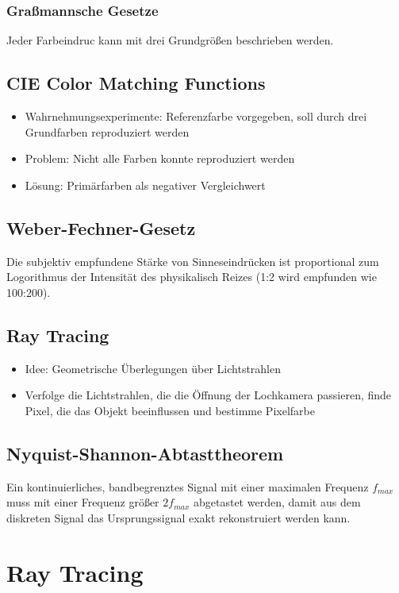 \subsubsection{Graßmannsche Gesetze}
Jeder Farbeindruc kann mit drei Grundgrößen beschrieben werden.


\subsection{CIE Color Matching Functions}
\begin{itemize}
	\item Wahrnehmungsexperimente: Referenzfarbe vorgegeben, soll durch drei Grundfarben reproduziert werden
	\item Problem: Nicht alle Farben konnte reproduziert werden
	\item Lösung: Primärfarben als negativer Vergleichwert
\end{itemize}


\subsection{Weber-Fechner-Gesetz}
Die subjektiv empfundene Stärke von Sinneseindrücken ist proportional zum Logorithmus der Intensität des physikalisch Reizes (1:2 wird empfunden wie 100:200).


\subsection{Ray Tracing}
\begin{itemize}
	\item Idee: Geometrische Überlegungen über Lichtstrahlen
	\item Verfolge die Lichtstrahlen, die die Öffnung der Lochkamera passieren, finde Pixel, die das Objekt beeinflussen und bestimme Pixelfarbe
\end{itemize}


\subsection{Nyquist-Shannon-Abtasttheorem}
Ein kontinuierliches, bandbegrenztes Signal mit einer maximalen Frequenz \(f_{max}\) muss mit einer Frequenz größer \(2f_{max}\) abgetastet werden, damit aus dem diskreten Signal das Ursprungssignal exakt rekonstruiert werden kann.



\section{Ray Tracing}

